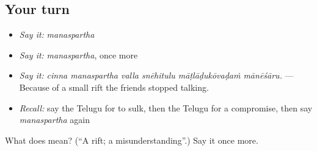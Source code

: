 \subsection*{Your turn}
\begin{itemize}
\raggedright
  \item \emph{Say it:} \emph{manaspartha}
  \item \emph{Say it:} \emph{manaspartha}, once more
  \item \emph{Say it:} \emph{cinna manaspartha valla snēhitulu māṭlāḍukōvaḍaṁ mānēśāru.} — Because of a small rift the friends stopped talking.
  \item \emph{Recall:} say the Telugu for to sulk, then the Telugu for a compromise, then say \emph{manaspartha} again
\end{itemize}

\begin{tcolorbox}[breakable,colback=teal!4,colframe=teal!35!black,title={Before you move on}]
What does  mean? (\textquotedblleft{}A rift; a misunderstanding\textquotedblright{}.) Say it once more.
\end{tcolorbox}

